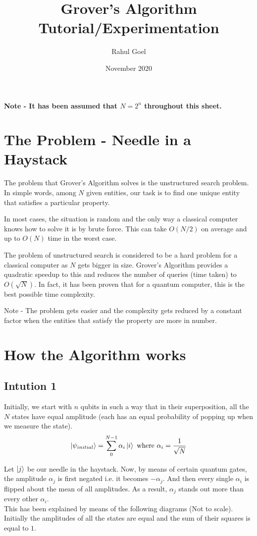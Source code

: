 \documentclass[13pt]{article}
\title{Grover's Algorithm Tutorial/Experimentation}
\author{Rahul Goel}
\date{November 2020}
\begin{document}
\maketitle

\textbf{Note - It has been assumed that $N = 2 ^ n$ throughout this sheet.}

\section{The Problem - Needle in a Haystack}
\indent The problem that Grover's Algorithm solves is the unstructured search problem. In simple words, among $N$ given entities, our task is to find one unique entity that satisfies a particular property.

In most cases, the situation is random and the only way a classical computer knows how to solve it is by brute force. This can take $O(N / 2)$ on average and up to $O(N)$ time in the worst case.

The problem of unstructured search is considered to be a hard problem for a classical computer as $N$ gets bigger in size. Grover's Algorithm provides a quadratic speedup to this and reduces the number of queries (time taken) to $O(\sqrt{N})$. In fact, it has been proven that for a quantum computer, this is the best possible time complexity.

Note - The problem gets easier and the complexity gets reduced by a constant factor when the entities that satisfy the property are more in number.

\section{How the Algorithm works}
\subsection{Intution 1}
Initially, we start with $n$ qubits in such a way that in their superposition, all the $N$ states have equal amplitude (each has an equal probability of popping up when we measure the state).
$$\ket{\psi_{initial}} = \sum_{0}^{N-1} {\alpha_i}\ket{i} \text{ where } \alpha_i = \frac{1} {\sqrt{N}}$$

Let $\ket{j}$ be our needle in the haystack.
Now, by means of certain quantum gates, the amplitude $\alpha_j$ is first negated i.e. it becomes $-\alpha_j$. And then every single $\alpha_i$ is flipped about the mean of all amplitudes. As a result, $\alpha_j$ stands out more than every other $\alpha_i$.
\\[3cm]
\indent This has been explained by means of the following diagrams (Not to scale).
Initially the amplitudes of all the states are equal and the sum of their squares is equal to $1$.
\end{document}
